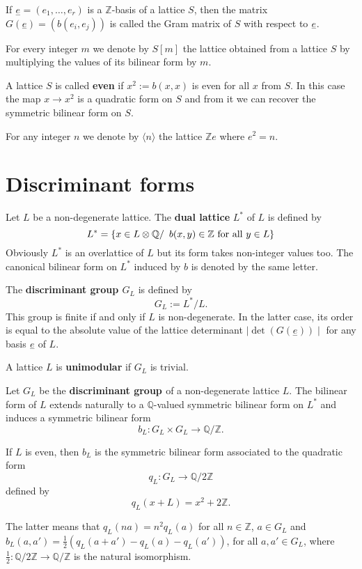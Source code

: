 \documentclass{amsart}
\begin{document}
If $\underset{-}{e}=(e_1,\ldots, e_r)$ is a $\mathbb Z$-basis of a lattice $S$, then the matrix 
$G(\underset{-}{e})=(b(e_i,e_j))$ is called the Gram matrix of $S$ with respect to $\underset{-}{e}$.

For every integer $m$ we denote by $S[m]$ the lattice obtained from a lattice $S$ by multiplying the values of its bilinear form by $m$.

A lattice $S$ is called {\bf{even}} if $x^2:=b(x,x)$ is even for all $x$ from $S$. In this case the map $x \rightarrow x^2$ is a quadratic form on $S$ and from it we can recover the symmetric bilinear form on $S$.

For any integer $n$ we denote by $\langle n \rangle$ the lattice $\mathbb Z e$ where $e^2=n$.

\section{Discriminant forms}

Let $L$ be a non-degenerate lattice. 
The {\bf{dual lattice}} $L^*$ of $L$ is defined by
$$L^* =\{x\in L \otimes \mathbb Q /\,\,\, b(x,y)\in \mathbb Z \hbox{  for all }y \in L \}$$
Obviously $L^*$ is an overlattice of $L$ but its form takes non-integer values too. The canonical bilinear form on $L^*$ induced by $b$ is denoted by the same letter.

The {\bf{discriminant group $G_L$}} is defined by
$$G_L:=L^*/L.$$
This group is finite if and only if $L$ is non-degenerate. In the latter case, its order is equal to the absolute value of the lattice determinant $\mid \det (G(\underset{-}{e})) \mid$ for any basis $\underset{-}{e}$ of $L$.

A lattice $L$ is {\bf{unimodular}} if $G_L$ is trivial.

Let $G_L$ be the {\bf{discriminant group }} of a non-degenerate lattice $L$. The bilinear form of $L$ extends naturally to a $\mathbb Q$-valued symmetric bilinear form on $L^*$ and induces a symmetric bilinear form 
$$b_L: G_L \times G_L \rightarrow\mathbb Q / \mathbb Z.$$

If $L$ is even, then $b_L$ is the symmetric bilinear form associated to the quadratic form 
$$q_L: G_L \rightarrow \mathbb Q/2\mathbb Z$$
defined by
$$q_L(x+L)=x^2+2\mathbb Z.$$

The latter means that $q_L(na)=n^2q_L(a)$ for all $n\in \mathbb Z$, $a\in G_L$ and $b_L(a,a')=\frac {1}{2}(q_L(a+a')-q_L(a)-q_L(a'))$, for all $a,a' \in G_L$, where $\frac {1}{2}:\mathbb Q/2 \mathbb Z \rightarrow \mathbb Q / \mathbb Z$ is the natural isomorphism.
\end{document}
